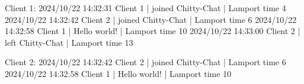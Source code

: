 \documentclass[a4paper,11pt]{article}
\begin{document}
Client 1:
2024/10/22 14:32:31 Client 1 | joined Chitty-Chat | Lamport time 4
2024/10/22 14:32:42 Client 2 | joined Chitty-Chat | Lamport time 6
2024/10/22 14:32:58 Client 1 | Hello world! | Lamport time 10
2024/10/22 14:33:00 Client 2 | left Chitty-Chat | Lamport time 13

Client 2:
2024/10/22 14:32:42 Client 2 | joined Chitty-Chat | Lamport time 6
2024/10/22 14:32:58 Client 1 | Hello world! | Lamport time 10
\end{document}
